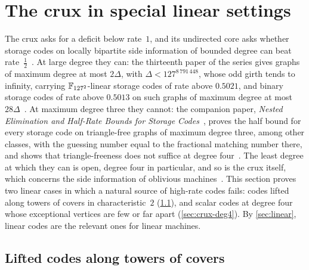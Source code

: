\section{The crux in special linear settings}\label{sec:crux}

The crux asks for a deficit below rate~$1$, and its undirected core asks whether storage codes on locally bipartite side
information of bounded degree can beat rate~$\frac12$~\cite[Question~6.1]{FourthPaper2026}. At large degree they can: the
thirteenth paper of the series gives graphs of maximum degree at most $2\Delta$, with $\Delta<127^{8\,791\,448}$, whose odd
girth tends to infinity, carrying $\mathbb{F}_{127^2}$-linear storage codes of rate above $0.5021$, and binary storage codes of rate
above $0.5013$ on such graphs of maximum degree at most $28\Delta$~\cite[Corollary~U]{StorageCodes2026}. At maximum degree
three they cannot: the companion paper, \emph{Nested Elimination and Half-Rate Bounds for Storage Codes}~\cite{SeventhPaper2026},
proves the half bound for every storage code on triangle-free graphs of maximum degree three, among other classes, with the
guessing number equal to the fractional matching number there, and shows that triangle-freeness does not suffice at degree
four~\cite[Example~7.8]{SeventhPaper2026}. The least degree at which they can is open, degree four in particular, and so is
the crux itself, which concerns the side information of oblivious machines~\cite[Definition~4.8]{FourthPaper2026}. This
section proves two linear cases in which a natural
source of high-rate codes fails: codes lifted along towers of covers in characteristic~$2$ (\cref{sec:crux-towers}), and scalar
codes at degree four whose exceptional vertices are few or far apart (\cref{sec:crux-deg4}). By \cref{sec:linear}, linear codes
are the relevant ones for linear machines.

\subsection{Lifted codes along towers of covers}\label{sec:crux-towers}

